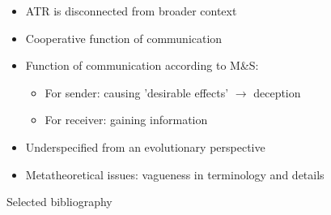 \documentclass[xcolor=table]{beamer}       %
\begin{document}
\begin{frame}{\insertsection}
    \begin{itemize}
        \item ATR is disconnected from broader context
        \item Cooperative function of communication
        \item Function of communication according to M\&S:
            \begin{itemize}
                \item For sender: causing 'desirable effects' $\to$ deception
                \item For receiver: gaining information
            \end{itemize}
        \item Underspecified from an evolutionary perspective
        \item Metatheoretical issues: vagueness in terminology and details
    \end{itemize}
\end{frame}

\begin{frame}{Selected bibliography}
    \nocite{Scott-Phillips08, MS11, Tomasello09, Sperber01, Sperber10}
    \printbibliography
\end{frame}
\end{document}
